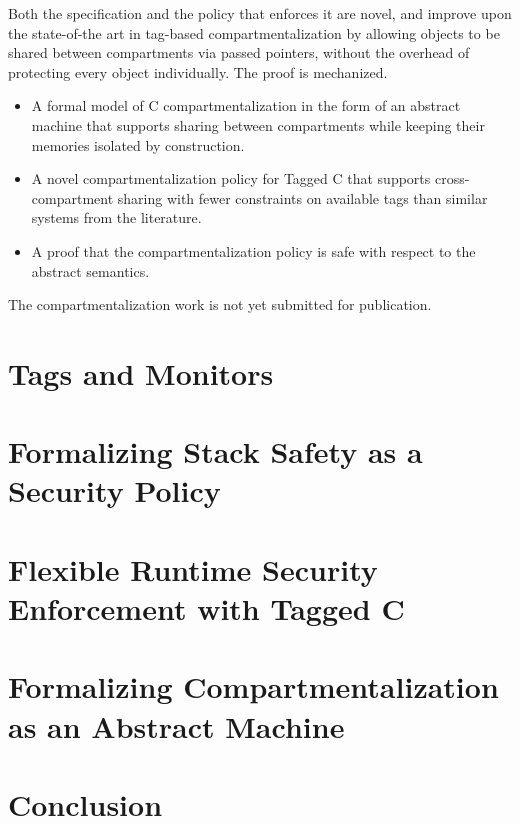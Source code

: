 \documentclass{report}
\begin{document}
Both the specification and the policy that enforces it are novel, and improve upon the
state-of-the art in tag-based compartmentalization by allowing objects to be shared between
compartments via passed pointers, without the overhead of protecting every object individually.
The proof is mechanized.

\begin{itemize}
\item A formal model of C compartmentalization in the form of an abstract machine that
  supports sharing between compartments while keeping their memories isolated by construction.
\item A novel compartmentalization policy for Tagged C that supports cross-compartment
  sharing with fewer constraints on available tags than similar systems from the literature.
\item A proof that the compartmentalization policy is safe with respect to the abstract semantics.
\end{itemize}

The compartmentalization work is not yet submitted for publication.

\chapter{Tags and Monitors}
\label{ch:background}

\chapter{Formalizing Stack Safety as a Security Policy}
\label{ch:stacksafety}

\chapter{Flexible Runtime Security Enforcement with Tagged C}
\label{ch:taggedc}

\chapter{Formalizing Compartmentalization as an Abstract Machine}
\label{ch:compartments}

\chapter{Conclusion}



\end{document}

